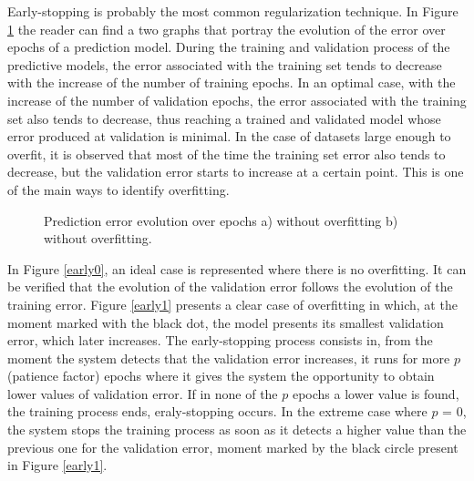 Early-stopping is probably the most common regularization technique. In Figure \ref{early} the reader can find a two graphs that portray the evolution of the error over epochs of a prediction model. During the training and validation process of the predictive models, the error associated with the training set tends to decrease with the increase of the number of training epochs. In an optimal case, with the increase of the number of validation epochs, the error associated with the training set also tends to decrease, thus reaching a trained and validated model whose error produced at validation is minimal. In the case of datasets large enough to overfit, it is observed that most of the time the training set error also tends to decrease, but the validation error starts to increase at a certain point. This is one of the main ways to identify overfitting.

\begin{figure}[h!]
\captionsetup[subfigure]{position=b}
\centering
{}
\hspace{0.05\textwidth}
\caption{Prediction error evolution over epochs a) without overfitting b) without overfitting.}
\label{early}
\end{figure}

In Figure \ref{early0}, an ideal case is represented where there is no overfitting. It can be verified that the evolution of the validation error follows the evolution of the training error. Figure \ref{early1} presents a clear case of overfitting in which, at the moment marked with the black dot, the model presents its smallest validation error, which later increases. The early-stopping process consists in, from the moment the system detects that the validation error increases, it runs for more $p$ (patience factor) epochs where it gives the system the opportunity to obtain lower values of validation error. If in none of the $p$ epochs a lower value is found, the training process ends, eraly-stopping occurs. In the extreme case where $p$ = 0, the system stops the training process as soon as it detects a higher value than the previous one for the validation error, moment marked by the black circle present in Figure \ref{early1}.


